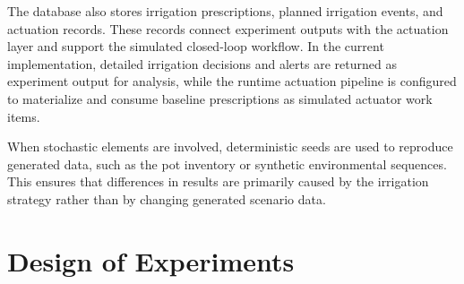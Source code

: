 \par The database also stores irrigation prescriptions, planned irrigation events, and
    actuation records. These records connect experiment outputs with the actuation layer
    and support the simulated closed-loop workflow. In the current implementation,
    detailed irrigation decisions and alerts are returned as experiment output for
    analysis, while the runtime actuation pipeline is configured to materialize and
    consume baseline prescriptions as simulated actuator work items.

\par When stochastic elements are involved, deterministic seeds are used to reproduce
    generated data, such as the pot inventory or synthetic environmental sequences. This
    ensures that differences in results are primarily caused by the irrigation strategy
    rather than by changing generated scenario data.

\section{Design of Experiments}
\label{sec:ch4sec2}

